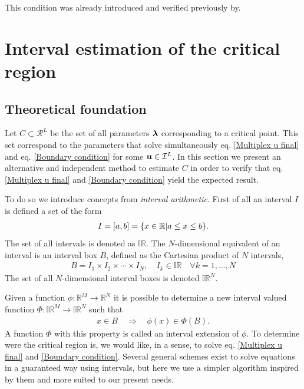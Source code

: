 \documentclass[
11pt, %
english, %
singlespacing, %
nolistspacing, %
liststotoc, %
headsepline, %
]{MastersDoctoralThesis} %
\begin{document}
This condition was already introduced and verified previously by\missingref{}.

\section{Interval estimation of the critical region}

\subsection{Theoretical foundation}

Let $C \subset \mathcal{R}^L$ be the set of all parameters $\boldsymbol{\mathrm{\lambda}}$ corresponding to a critical point. This set correspond to the parameters that solve simultaneously eq. \eqref{Multiplex u final} and eq. \eqref{Boundary condition} for some $\boldsymbol{\mathrm{u}} \in \mathcal{I}^L$. In this section we present an alternative and independent method to estimate $C$ in order to verify that eq. \eqref{Multiplex u final} and \eqref{Boundary condition} yield the expected result.

To do so we introduce concepts from \emph{interval arithmetic}\missingref{}. First of all an interval $I$ is defined a set of the form
\begin{align}
	I = \left[a, b\right] = \{x \in \mathbb{R} | a \leq x \leq b\}.
\end{align}
The set of all intervals is denoted as $\mathbb{IR}$. The $N$-dimensional equivalent of an interval is an interval box $B$, defined as the Cartesian product of $N$ intervals,
\begin{align}
	B = I_1 \times I_2 \times \cdots \times I_N, \quad I_k \in \mathbb{IR} \quad \forall k = 1, \dots, N
\end{align}
The set of all $N$-dimensional interval boxes is denoted $\mathbb{IR}^N$.

Given a function $\phi : \mathbb{R}^M \rightarrow \mathbb{R}^N$ it is possible\missingref{} to determine a new interval valued function $\Phi : \mathbb{IR}^M \rightarrow \mathbb{IR}^N$ such that
\begin{align}
	x \in B \quad \Rightarrow \quad \phi(x) \in \Phi(B). \label{Definition interval extension}
\end{align}
A function $\Phi$ with this property is called an interval extension of $\phi$. To determine were the critical region is, we would like, in a sense, to solve eq. \eqref{Multiplex u final} and \eqref{Boundary condition}. Several general schemes exist to solve equations in a guaranteed way using intervals\missingref{}, but here we use a simpler algorithm inspired by them and more suited to our present needs.
\end{document}
